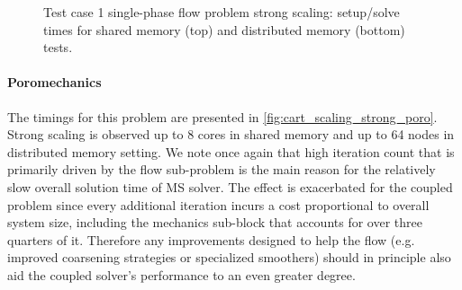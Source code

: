 \begin{figure} [htbp]
  \begin{subfigure}[t]{0.48\textwidth}
    \centering
    
  \end{subfigure}
  \hfill
  \begin{subfigure}[t]{0.48\textwidth}
    \centering
    
  \end{subfigure}
  \begin{subfigure}[t]{0.48\textwidth}
    \centering
    
  \end{subfigure}
  \hfill
  \begin{subfigure}[t]{0.48\textwidth}
    \centering
    
  \end{subfigure}
  \caption[Test case 1 single-phase flow problem strong scaling]{Test case 1 single-phase flow problem strong scaling: setup/solve times for shared memory (top) and distributed memory (bottom) tests.}
  \label{fig:cart_scaling_strong_flow}
\end{figure}

\paragraph{Poromechanics}
The timings for this problem are presented in \cref{fig:cart_scaling_strong_poro}.   Strong scaling is observed up to 8 cores in shared memory and up to 64 nodes in distributed memory setting.   We note once again that high iteration count that is primarily driven by the flow sub-problem is the main reason for the relatively slow overall solution time of MS solver.   The effect is exacerbated for the coupled problem since every additional iteration incurs a cost proportional to overall system size, including the mechanics sub-block that accounts for over three quarters of it.   Therefore any improvements designed to help the flow (e.g. improved coarsening strategies or specialized smoothers) should in principle also aid the coupled solver's performance to an even greater degree.

